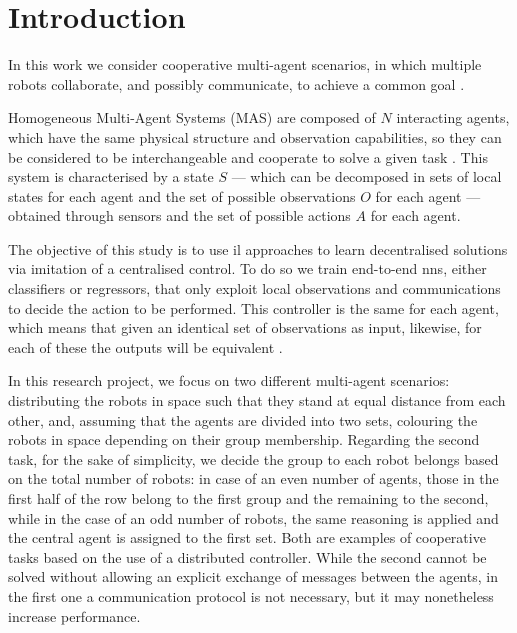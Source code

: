 \chapter*{Introduction}
\label{chap:intro}
In this work we consider cooperative multi-agent scenarios, in which multiple 
robots collaborate, and possibly communicate, to achieve a common goal 
\cite[][]{ismail2018survey}.

Homogeneous Multi-Agent Systems (MAS) are composed of $N$ interacting 
agents, which have the same physical structure and observation capabilities, so 
they can be considered to be interchangeable and cooperate to solve a given 
task \cite[][]{stone2000multiagent, vsovsic2016inverse}.
This system is characterised by a state $S$ — which can be decomposed in sets of 
local states for each agent and the set of possible observations $O$ for each agent 
— obtained through sensors and the set of possible actions  $A$ for each agent.

The objective of this study is to use \gls{il} approaches to learn decentralised 
solutions via imitation of a centralised control. To do so we train end-to-end 
\glspl{nn}, either classifiers or regressors, that only exploit local observations and 
communications to decide the action to be performed. This controller is the same 
for each agent, which means that given an identical set of observations as input, 
likewise, for each of these the outputs will be equivalent 
\cite[][]{ross2011reduction, tolstaya2020learning}.

In this research project, we focus on two different multi-agent scenarios: 
distributing the robots in space such that they stand at equal distance from each 
other, and, assuming that the agents are divided into two sets, colouring the 
robots in space depending on their group membership. 
Regarding the second task, for the sake of simplicity, we decide the group to each 
robot belongs based on the total number of robots: in case of an even number of 
agents, those in the first half of the row belong to the first group and the 
remaining to the second, while in the case of an odd number of robots, the same 
reasoning is applied and the central agent is assigned to the first set.
Both are examples of cooperative tasks based on the use of a distributed 
controller. While the second cannot be solved without allowing an explicit 
exchange of messages between the agents, in the first one a communication 
protocol is not necessary, but it may nonetheless increase performance.

